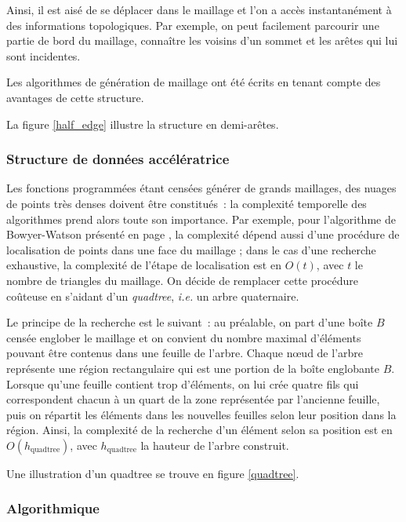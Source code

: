 \documentclass[12pt,a4paper]{report}
\begin{document}
Ainsi, il est aisé de se déplacer dans le maillage et l'on a accès instantanément à des informations topologiques. Par exemple, on peut facilement parcourir une partie de bord du maillage, connaître les voisins d'un sommet et les arêtes qui lui sont incidentes.

Les algorithmes de génération de maillage ont été écrits en tenant compte des avantages de cette structure.

La figure \ref{half_edge} illustre la structure en demi-arêtes.


\subsubsection{Structure de données accélératrice}

Les fonctions programmées étant censées générer de \og grands \fg{} maillages, des nuages de points très denses doivent être constitués~: la  complexité temporelle des algorithmes prend alors toute son importance. Par exemple, pour l'algorithme de Bowyer-Watson présenté en page \pageref{Bowyer-Watson}, la complexité dépend aussi d'une procédure de localisation de points dans une face du maillage ; dans le cas d'une recherche exhaustive, la complexité de l'étape de localisation est en $O(t)$, avec $t$ le nombre de triangles du maillage. On décide de remplacer cette procédure coûteuse en s'aidant d'un \emph{quadtree}, \emph{i.e.} un arbre quaternaire.

Le principe de la recherche est le suivant~: au préalable, on part d'une boîte $B$ censée englober le maillage et on convient du nombre maximal d'éléments pouvant être contenus dans une feuille de l'arbre. Chaque n\oe{}ud de l'arbre représente une région rectangulaire qui est une portion de la boîte englobante $B$. Lorsque qu'une feuille contient trop d'éléments, on lui crée quatre fils qui correspondent chacun à un quart de la zone représentée par l'ancienne feuille, puis on répartit les éléments dans les nouvelles feuilles selon leur position dans la région. Ainsi, la complexité de la recherche d'un élément selon sa position est en $O(h_{\text{quadtree}})$, avec $h_{\text{quadtree}}$ la hauteur de l'arbre construit.

Une illustration d'un quadtree se trouve en figure \ref{quadtree}.

\subsubsection{Algorithmique}
\end{document}
